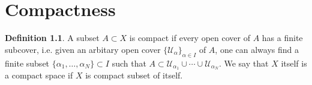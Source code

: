 \documentclass[a4paper]{book}
\theoremstyle{definition}
\newtheorem{definition}{Definition}[]
\begin{document}
\chapter{Compactness}

\begin{defbox}
    \begin{definition}
        A {\color{mathobj}subset} \(A \subset X\) is {\color{maththen}compact} if every open cover of \(A\) has a finite subcover, i.e. given an arbitary open cover \(\{\mathcal{U}_\alpha\}_{\alpha \in I}\) of \(A\), one can always find a finite subset \(\{\alpha_1, \ldots, \alpha_N\} \subset I\) such that \(A \subset \mathcal{U}_{\alpha_1} \cup \cdots \cup \mathcal{U}_{\alpha_N}\). We say that \(X\) itself is a {\color{maththen}compact space} if \(X\) is compact subset of itself.
    \end{definition}
\end{defbox}
\end{document}
